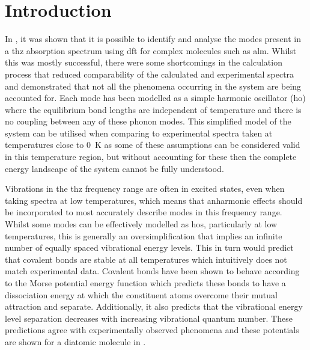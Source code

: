 \section{Introduction}
In , it was shown that it is possible to identify and analyse the modes present in a \acrshort{thz} absorption spectrum using \acrshort{dft} for complex molecules such as \acrshort{alm}. Whilst this was mostly successful, there were some shortcomings in the calculation process that reduced comparability of the calculated and experimental spectra and demonstrated that not all the phenomena occurring in the system are being accounted for. Each mode has been modelled as a simple harmonic oscillator (\acrshort{ho}) where the equilibrium bond lengths are independent of temperature and there is no coupling between any of these phonon modes. This simplified model of the system can be utilised when comparing to experimental spectra taken at temperatures close to \SI{0}{K} as some of these assumptions can be considered valid in this temperature region, but without accounting for these then the complete energy landscape of the system cannot be fully understood. 

Vibrations in the \acrshort{thz} frequency range are often in excited states, even when taking spectra at low temperatures, which means that anharmonic effects should be incorporated to most accurately describe modes in this frequency range. Whilst some modes can be effectively modelled as \acrshort{ho}s, particularly at low temperatures, this is generally an oversimplification that implies an infinite number of equally spaced vibrational energy levels. This in turn would predict that covalent bonds are stable at all temperatures which intuitively does not match experimental data. Covalent bonds have been shown to behave according to the Morse potential energy function which predicts these bonds to have a dissociation energy at which the constituent atoms overcome their mutual attraction and separate. Additionally, it also predicts that the vibrational energy level separation decreases with increasing vibrational quantum number. These predictions agree with experimentally observed phenomena and these potentials are shown for a diatomic molecule in . 

